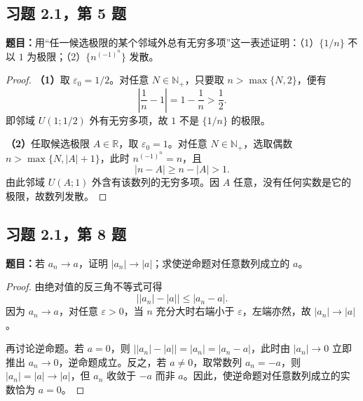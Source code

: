 \documentclass[UTF8, fontset=fandol, a4paper, 12pt]{ctexart}
\newcommand{\R}{\mathbb R}
\newcommand{\Nplus}{\mathbb N_{+}}
\theoremstyle{definition}
\begin{document}
\subsection{习题 2.1，第 5 题}
\noindent\textbf{题目：}用“任一候选极限的某个邻域外总有无穷多项”这一表述证明：（1）$\{1/n\}$ 不以 $1$ 为极限；（2）$\{n^{(-1)^n}\}$ 发散。
\begin{proof}
\textbf{（1）}取 $\varepsilon_0=1/2$。对任意 $N\in\Nplus$，只要取 $n>\max\{N,2\}$，便有
\[
 \left|\frac1n-1\right|=1-\frac1n>\frac12.
\]
即邻域 $U(1;1/2)$ 外有无穷多项，故 $1$ 不是 $\{1/n\}$ 的极限。

\medskip
\textbf{（2）}任取候选极限 $A\in\R$，取 $\varepsilon_0=1$。对任意 $N\in\Nplus$，选取偶数 $n>\max\{N,|A|+1\}$，此时 $n^{(-1)^n}=n$，且
\[
 |n-A|\ge n-|A|>1.
\]
由此邻域 $U(A;1)$ 外含有该数列的无穷多项。因 $A$ 任意，没有任何实数是它的极限，故数列发散。
\end{proof}

\subsection{习题 2.1，第 8 题}
\noindent\textbf{题目：}若 $a_n\to a$，证明 $|a_n|\to|a|$；求使逆命题对任意数列成立的 $a$。
\begin{proof}
由绝对值的反三角不等式可得
\[
 \bigl||a_n|-|a|\bigr|\le|a_n-a|.
\]
因为 $a_n\to a$，对任意 $\varepsilon>0$，当 $n$ 充分大时右端小于 $\varepsilon$，左端亦然，故 $|a_n|\to|a|$。

再讨论逆命题。若 $a=0$，则 $\bigl||a_n|-|a|\bigr|=|a_n|=|a_n-a|$，此时由 $|a_n|\to0$ 立即推出 $a_n\to0$，逆命题成立。反之，若 $a\ne0$，取常数列 $a_n=-a$，则 $|a_n|=|a|\to|a|$，但 $a_n$ 收敛于 $-a$ 而非 $a$。因此，使逆命题对任意数列成立的实数恰为 $a=0$。
\end{proof}
\end{document}
